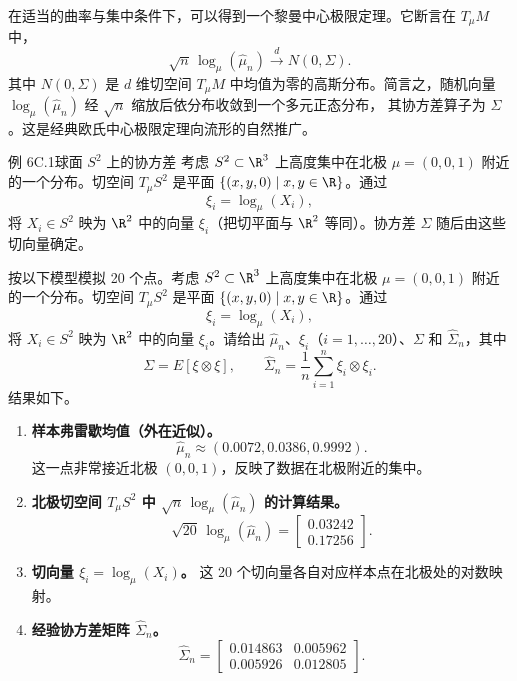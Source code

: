 在适当的曲率与集中条件下，可以得到一个黎曼中心极限定理。它断言在 $T_\mu M$ 中，%
%
\[
  \sqrt n\,\log_\mu(\hat\mu_n)\xrightarrow{d}N(0,\Sigma).
\]
其中 $N(0,\Sigma)$ 是 $d$ 维切空间 $T_\mu M$ 中均值为零的高斯分布。简言之，随机向量 $\log_\mu(\hat\mu_n)$ 经 $\sqrt n$ 缩放后依分布收敛到一个多元正态分布，
其协方差算子为 $\Sigma$。这是经典欧氏中心极限定理向流形的自然推广。

\begin{statement}{例 6C.1}{球面 $S^2$ 上的协方差}
考虑 $S^2\subset\R^3$ 上高度集中在北极 $\mu=(0,0,1)$ 附近的一个分布。切空间 $T_\mu S^2$ 是平面 $\{(x,y,0)\mid x,y\in\R\}$。通过
\[
  \xi_i=\log_\mu(X_i),
\]
将 $X_i\in S^2$ 映为 $\R^2$ 中的向量 $\xi_i$（把切平面与 $\R^2$ 等同）。协方差 $\Sigma$ 随后由这些切向量确定。

按以下模型模拟 20 个点。考虑 $S^2\subset\R^3$ 上高度集中在北极 $\mu=(0,0,1)$ 附近的一个分布。切空间 $T_\mu S^2$ 是平面 $\{(x,y,0)\mid x,y\in\R\}$。通过
\[
  \xi_i=\log_\mu(X_i),
\]
将 $X_i\in S^2$ 映为 $\R^2$ 中的向量 $\xi_i$。请给出 $\hat\mu_n$、$\xi_i$（$i=1,\dots,20$）、$\Sigma$ 和 $\hat\Sigma_n$，其中
\[
  \Sigma=E[\xi\otimes\xi],\qquad
  \hat\Sigma_n=\frac1n\sum_{i=1}^n\xi_i\otimes\xi_i.
\]
结果如下。

\begin{enumerate}
\item \textbf{样本弗雷歇均值（外在近似）。}
\[
  \hat\mu_n\approx(0.0072,0.0386,0.9992).
\]
这一点非常接近北极 $(0,0,1)$，反映了数据在北极附近的集中。
\item \textbf{北极切空间 $T_\mu S^2$ 中 $\sqrt n\,\log_\mu(\hat\mu_n)$ 的计算结果。}
\[
  \sqrt{20}\,\log_\mu(\hat\mu_n)
   =\begin{bmatrix}0.03242\\0.17256\end{bmatrix}.
\]
\item \textbf{切向量 $\xi_i=\log_\mu(X_i)$。}
这 20 个切向量各自对应样本点在北极处的对数映射。
\item \textbf{经验协方差矩阵 $\hat\Sigma_n$。}%
%
\[
  \hat\Sigma_n=\begin{bmatrix}
     0.014863&0.005962\\
     0.005926&0.012805
  \end{bmatrix}.
\]
\end{enumerate}
\end{statement}
